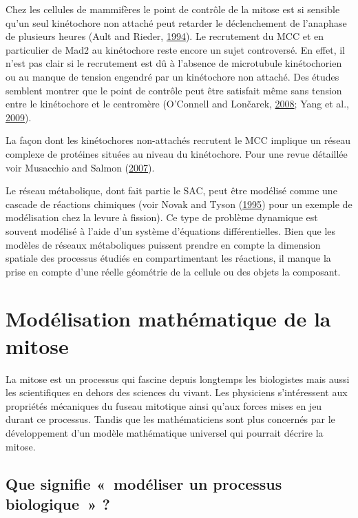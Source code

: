 \documentclass[12pt,a4paper,twoside,openright]{book}
\begin{document}
Chez les cellules de mammifères le point de contrôle de la mitose est si
sensible qu'un seul kinétochore non attaché peut retarder le
déclenchement de l'anaphase de plusieurs heures (Ault and Rieder,
\protect\hyperlink{ref-Ault1994}{1994}). Le recrutement du MCC et en
particulier de Mad2 au kinétochore reste encore un sujet controversé. En
effet, il n'est pas clair si le recrutement est dû à l'absence de
microtubule kinétochorien ou au manque de tension engendré par un
kinétochore non attaché. Des études semblent montrer que le point de
contrôle peut être satisfait même sans tension entre le kinétochore et
le centromère (O'Connell and Lončarek,
\protect\hyperlink{ref-OConnell2008}{2008}; Yang et al.,
\protect\hyperlink{ref-Yang2009}{2009}).

La façon dont les kinétochores non-attachés recrutent le MCC implique un
réseau complexe de protéines situées au niveau du kinétochore. Pour une
revue détaillée voir Musacchio and Salmon
(\protect\hyperlink{ref-Musacchio2007}{2007}).

Le réseau métabolique, dont fait partie le SAC, peut être modélisé comme
une cascade de réactions chimiques (voir Novak and Tyson
(\protect\hyperlink{ref-Novak1995}{1995}) pour un exemple de
modélisation chez la levure à fission). Ce type de problème dynamique
est souvent modélisé à l'aide d'un système d'équations différentielles.
Bien que les modèles de réseaux métaboliques puissent prendre en compte
la dimension spatiale des processus étudiés en compartimentant les
réactions, il manque la prise en compte d'une réelle géométrie de la
cellule ou des objets la composant.

\section{Modélisation mathématique de la
mitose}\label{moduxe9lisation-mathuxe9matique-de-la-mitose}

La mitose est un processus qui fascine depuis longtemps les biologistes
mais aussi les scientifiques en dehors des sciences du vivant. Les
physiciens s'intéressent aux propriétés mécaniques du fuseau mitotique
ainsi qu'aux forces mises en jeu durant ce processus. Tandis que les
mathématiciens sont plus concernés par le développement d'un modèle
mathématique universel qui pourrait décrire la mitose.

\subsection{Que signifie «~modéliser un processus biologique~»
?}\label{que-signifie-moduxe9liser-un-processus-biologique}
\end{document}
